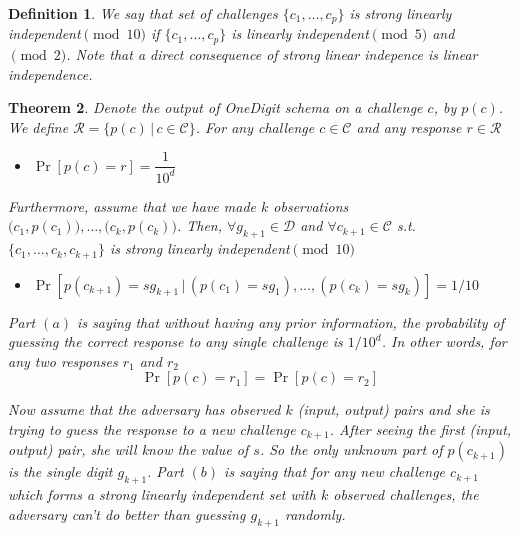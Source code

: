 \documentclass{article}
\newtheorem{theorem}{Theorem}
\newtheorem{definition}[theorem]{Definition}
\begin{document}
\begin{definition}
We say that set of challenges $\{c_1,\ldots,c_p\}$ is strong linearly independent$\pmod{10}$ if $\{c_1,\ldots,c_p\}$ is linearly independent$\pmod{5}$ and$\pmod{2}$. Note that a direct consequence of strong linear indepence is linear independence.
\end{definition}
                                                                                                            

\begin{theorem}
	Denote the output of OneDigit schema on a challenge $c$, by $p(c)$. We define $\mathcal{R}=\{p(c) \, | \, c\in\mathcal{C}\}$. For any challenge $c\in \mathcal{C}$ and any response $r\in \mathcal{R}$
	\begin{itemize} 
		\item[$(a)$]$\Pr[p(c)=r]=\dfrac{1}{10^d}$
	\end{itemize}
Furthermore, assume that we have made $k$ observations $\big(c_1,p(c_1)\big),\ldots, \big(c_k, p(c_k)\big)$. Then, $\forall g_{k+1}\in\mathcal{D}$ and $\forall c_{k+1}\in \mathcal{C}$ s.t. $\{c_1,\ldots,c_k,c_{k+1}\}$ is strong linearly independent$\pmod{10}$ 
	\begin{itemize}
		\item[$(b)$] $\Pr[p(c_{k+1})=s g_{k+1} \, | \, (p(c_1)=s g_1),\ldots, (p(c_k)=s g_k)]=1/10$
	\end{itemize}
Part $(a)$ is saying that without having any prior information, the probability of guessing the correct response to any single challenge is ${1}/{10^d}$. In other words, for any two responses $r_1$ and $r_2$
$$\Pr[p(c)=r_1]=\Pr[p(c)=r_2]$$

\noindent Now assume that the adversary has observed $k$ (input, output) pairs and she is trying to guess the response to a new challenge $c_{k+1}$. After seeing the first (input, output) pair, she will know the value of $s$. So the only unknown part of $p(c_{k+1})$ is the single digit $g_{k+1}$. Part $(b)$ is saying that for any new challenge $c_{k+1}$ which forms a strong linearly independent set with $k$ observed challenges, the adversary can't do better than guessing $g_{k+1}$ randomly.

\end{theorem}
\end{document}
